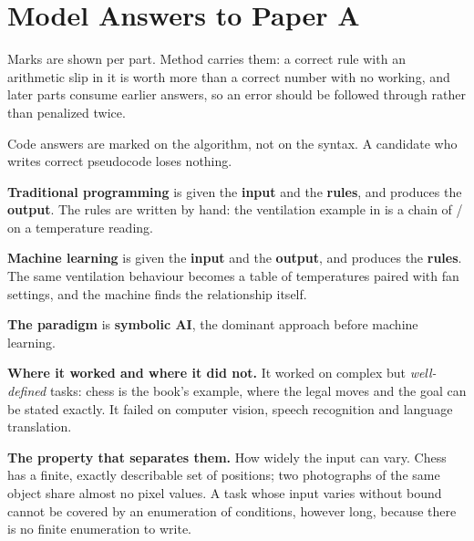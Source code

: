 
\renewcommand{\answerprefix}{ansa}

\chapter{Model Answers to Paper A}
\label{ansa:ch:answers}

Marks are shown per part. Method carries them: a correct rule with an arithmetic slip in it is worth
more than a correct number with no working, and later parts consume earlier answers, so an error
should be followed through rather than penalized twice.

Code answers are marked on the algorithm, not on the syntax. A candidate who writes correct
pseudocode loses nothing.


\textbf{Traditional programming} is given the \textbf{input} and the \textbf{rules}, and produces
the \textbf{output}. The rules are written by hand: the ventilation example in 
is a chain of / on a temperature reading.

\textbf{Machine learning} is given the \textbf{input} and the \textbf{output}, and produces the
\textbf{rules}. The same ventilation behaviour becomes a table of temperatures paired with fan
settings, and the machine finds the relationship itself. 

\textbf{The paradigm} is \textbf{symbolic AI}, the dominant approach before machine learning.

\textbf{Where it worked and where it did not.} It worked on complex but \emph{well-defined} tasks:
chess is the book's example, where the legal moves and the goal can be stated exactly. It failed on
computer vision, speech recognition and language translation.

\textbf{The property that separates them.} How widely the input can vary. Chess has a finite,
exactly describable set of positions; two photographs of the same object share almost no pixel
values. A task whose input varies without bound cannot be covered by an enumeration of conditions,
however long, because there is no finite enumeration to write. 

